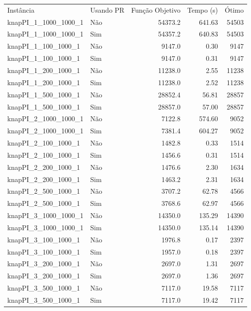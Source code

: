 \documentclass[11pt]{article}
\begin{document}
\begin{center}
\begin{tabular}{llrrr}
Instância & Usando PR & Função Objetivo & Tempo (s) & Ótimo\\
knapPI\_1\_1000\_1000\_1 & Não & 54373.2 & 641.63 & 54503\\
knapPI\_1\_1000\_1000\_1 & Sim & 54357.2 & 640.83 & 54503\\
knapPI\_1\_100\_1000\_1 & Não & 9147.0 & 0.30 & 9147\\
knapPI\_1\_100\_1000\_1 & Sim & 9147.0 & 0.31 & 9147\\
knapPI\_1\_200\_1000\_1 & Não & 11238.0 & 2.55 & 11238\\
knapPI\_1\_200\_1000\_1 & Sim & 11238.0 & 2.52 & 11238\\
knapPI\_1\_500\_1000\_1 & Não & 28852.4 & 56.81 & 28857\\
knapPI\_1\_500\_1000\_1 & Sim & 28857.0 & 57.00 & 28857\\
knapPI\_2\_1000\_1000\_1 & Não & 7122.8 & 574.60 & 9052\\
knapPI\_2\_1000\_1000\_1 & Sim & 7381.4 & 604.27 & 9052\\
knapPI\_2\_100\_1000\_1 & Não & 1482.8 & 0.33 & 1514\\
knapPI\_2\_100\_1000\_1 & Sim & 1456.6 & 0.31 & 1514\\
knapPI\_2\_200\_1000\_1 & Não & 1476.6 & 2.30 & 1634\\
knapPI\_2\_200\_1000\_1 & Sim & 1463.2 & 2.31 & 1634\\
knapPI\_2\_500\_1000\_1 & Não & 3707.2 & 62.78 & 4566\\
knapPI\_2\_500\_1000\_1 & Sim & 3768.6 & 62.97 & 4566\\
knapPI\_3\_1000\_1000\_1 & Não & 14350.0 & 135.29 & 14390\\
knapPI\_3\_1000\_1000\_1 & Sim & 14350.0 & 135.14 & 14390\\
knapPI\_3\_100\_1000\_1 & Não & 1976.8 & 0.17 & 2397\\
knapPI\_3\_100\_1000\_1 & Sim & 1957.0 & 0.18 & 2397\\
knapPI\_3\_200\_1000\_1 & Não & 2697.0 & 1.31 & 2697\\
knapPI\_3\_200\_1000\_1 & Sim & 2697.0 & 1.36 & 2697\\
knapPI\_3\_500\_1000\_1 & Não & 7117.0 & 19.58 & 7117\\
knapPI\_3\_500\_1000\_1 & Sim & 7117.0 & 19.42 & 7117\\
\end{tabular}
\end{center}
\end{document}
